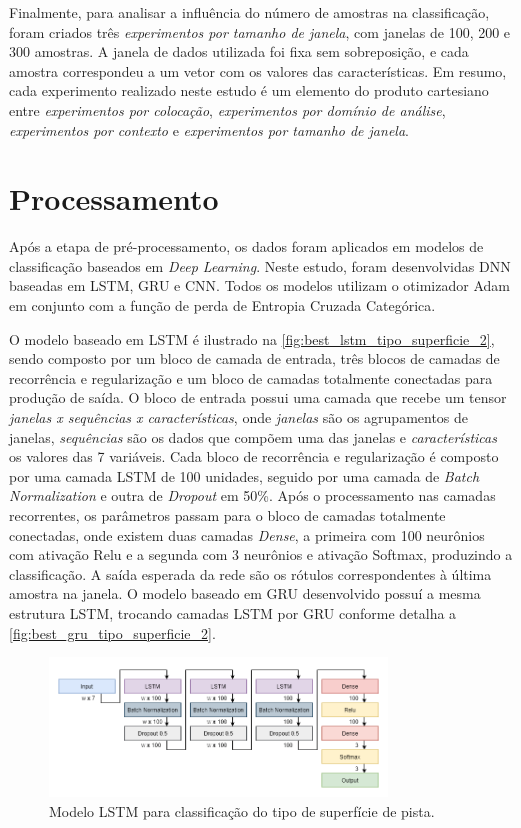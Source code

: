 Finalmente, para analisar a influência do número de amostras na classificação, foram criados três \emph{experimentos por tamanho de janela}, com janelas de 100, 200 e 300 amostras. A janela de dados utilizada foi fixa sem sobreposição, e cada amostra correspondeu a um vetor com os valores das características. Em resumo, cada experimento realizado neste estudo é um elemento do produto cartesiano entre \emph{experimentos por colocação}, \emph{experimentos por domínio de análise}, \emph{experimentos por contexto} e \emph{experimentos por tamanho de janela}.

\section{Processamento}

Após a etapa de pré-processamento, os dados foram aplicados em modelos de classificação baseados em \textit{Deep Learning}. Neste estudo, foram desenvolvidas DNN baseadas em LSTM, GRU e CNN. Todos os modelos utilizam o otimizador Adam em conjunto com a função de perda de Entropia Cruzada Categórica. 

O modelo baseado em LSTM é ilustrado na \autoref{fig:best_lstm_tipo_superficie_2}, sendo composto por um bloco de camada de entrada, três blocos de camadas de recorrência e regularização e um bloco de camadas totalmente conectadas para produção de saída. O bloco de entrada possui uma camada que recebe um tensor \emph{janelas x sequências x características}, onde \emph{janelas} são os agrupamentos de janelas, \emph{sequências} são os dados que compõem uma das janelas e \emph{características} os valores das 7 variáveis. Cada bloco de recorrência e regularização é composto por uma camada LSTM de 100 unidades, seguido por uma camada de \textit{Batch Normalization} e outra de \textit{Dropout} em 50\%. Após o processamento nas camadas recorrentes, os parâmetros passam para o bloco de camadas totalmente conectadas, onde existem duas camadas \textit{Dense}, a primeira com 100 neurônios com ativação Relu e a segunda com 3 neurônios e ativação Softmax, produzindo a classificação. A saída esperada da rede são os rótulos correspondentes à última amostra na janela. O modelo baseado em GRU desenvolvido possuí a mesma estrutura LSTM, trocando camadas LSTM por GRU conforme detalha a \autoref{fig:best_gru_tipo_superficie_2}.

\begin{figure}[h!]
  \centering
  \caption{Modelo LSTM para classificação do tipo de superfície de pista.}
  \label{fig:best_lstm_tipo_superficie_2}
  \includegraphics[width=0.8\textwidth]{figuras/fig_37.png}
\end{figure}

